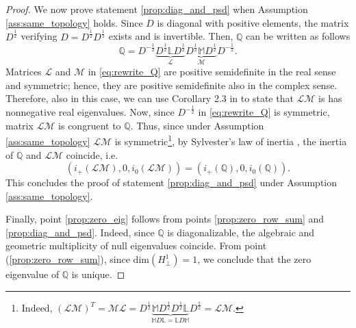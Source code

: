 \documentclass[a4paper]{article}
\theoremstyle{plain}
\newcommand{\Qset}{\mathbb{Q}}
\begin{document}
\begin{proof}
We now prove statement \eqref{prop:diag_and_psd} when Assumption \ref{ass:same_topology} holds. Since $D$ is diagonal with positive elements, the matrix $D^{\frac{1}{2}}$ verifying $D = D^{\frac{1}{2}}D^{\frac{1}{2}}$ exists and is invertible. Then, $\mathbb{Q}$ can be written as follows
		\begin{equation}
		\label{eq:rewrite_Q}
		\mathbb{Q} = D^{-\frac{1}{2}}\underbrace{D^{\frac{1}{2}}\mathbb{L} D^{\frac{1}{2}}}_{\mathcal{L}}\underbrace{D^{\frac{1}{2}}\mathbb{M} D^{\frac{1}{2}}}_{\mathcal{M}}D^{-\frac{1}{2}}.
		\end{equation}
		Matrices $\mathcal{L}$ and $\mathcal{M}$ in \eqref{eq:rewrite_Q} are positive semidefinite in the real sense and symmetric; hence, they are positive semidefinite also in the complex sense. Therefore, also in this case, we can use Corollary 2.3 in \cite{hong1991jordan} to state that  $\mathcal{L}\mathcal{M}$ is has nonnegative real eigenvalues. Now, since $D^{-\frac{1}{2}}$ in \eqref{eq:rewrite_Q} is symmetric, matrix $\mathcal{L}\mathcal{M}$ is congruent to $\mathbb{Q}$. Thus, since under Assumption \ref{ass:same_topology} $\mathcal{L}\mathcal{M}$ is symmetric\footnote{Indeed, $(\mathcal{L}\mathcal{M})^T = \mathcal{M}\mathcal{L} = D^{\frac{1}{2}}\underbrace{\mathbb{M} D^{\frac{1}{2}}D^{\frac{1}{2}}\mathbb{L}}_{\mathbb{M}D\mathbb{L} = \mathbb{L}D\mathbb{M}} D^{\frac{1}{2}} = \mathcal{L}\mathcal{M}$.}, by Sylvester's law of inertia \cite{horn2012matrix}, the inertia of $\mathbb{Q}$ and $\mathcal{L}\mathcal{M}$ coincide, i.e.
		\begin{equation*}
		\label{eq:same_inertia}
		(i_{+}(\mathcal{L}\mathcal{M}), 0, i_{0}(\mathcal{L}\mathcal{M})) = (i_{+}(\mathbb{Q}), 0, i_{0}(\mathbb{Q})).
		\end{equation*} 
		This concludes the proof of statement \eqref{prop:diag_and_psd} under Assumption \ref{ass:same_topology}.
		
		Finally, point \eqref{prop:zero_eig} follows from points \eqref{prop:zero_row_sum} and \eqref{prop:diag_and_psd}. Indeed, since $\Qset$ is diagonalizable, the algebraic and geometric multiplicity of null eigenvalues coincide. From point (\ref{prop:zero_row_sum}), since $\mathrm{dim}(H_{\perp}^1)=1$, we conclude that the zero eigenvalue of $\Qset$ is unique.
\end{proof}
\end{document}
